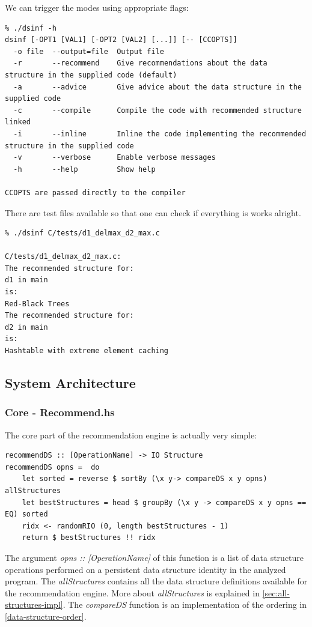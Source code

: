 \documentclass[a4paper,11pt]{article}
\begin{document}
\begin{appendices}
	We can trigger the modes using appropriate flags:
	
	\begingroup
    \fontsize{8pt}{12pt}\selectfont
    \begin{verbatim}  
% ./dsinf -h
dsinf [-OPT1 [VAL1] [-OPT2 [VAL2] [...]] [-- [CCOPTS]]
  -o file  --output=file  Output file
  -r       --recommend    Give recommendations about the data structure in the supplied code (default)
  -a       --advice       Give advice about the data structure in the supplied code
  -c       --compile      Compile the code with recommended structure linked
  -i       --inline       Inline the code implementing the recommended structure in the supplied code
  -v       --verbose      Enable verbose messages
  -h       --help         Show help

CCOPTS are passed directly to the compiler
    \end{verbatim}  
\endgroup
	
	There are test files available so that one can check if everything is works alright.
	\begin{verbatim}
% ./dsinf C/tests/d1_delmax_d2_max.c

C/tests/d1_delmax_d2_max.c:
The recommended structure for:
d1 in main
is:
Red-Black Trees
The recommended structure for:
d2 in main
is:
Hashtable with extreme element caching
	\end{verbatim}
	
	\subsection{System Architecture}
		\subsubsection{Core - Recommend.hs} \label{sec:recommend-impl}
		The core part of the recommendation engine is actually very simple:

\begin{verbatim}
recommendDS :: [OperationName] -> IO Structure
recommendDS opns =  do
    let sorted = reverse $ sortBy (\x y-> compareDS x y opns) allStructures
    let bestStructures = head $ groupBy (\x y -> compareDS x y opns == EQ) sorted
    ridx <- randomRIO (0, length bestStructures - 1)
    return $ bestStructures !! ridx
\end{verbatim}
		The argument \emph{opns :: [OperationName]} of this function is a list of data 
		structure operations performed on a persistent data structure identity in the 
		analyzed program. The \emph{allStructures} contains all the data structure definitions
		available for the recommendation engine. More about \emph{allStructures} is explained
		in \autoref{sec:all-structures-impl}. The \emph{compareDS} function is an implementation
		of the ordering in \autoref{data-structure-order}.
		

\end{appendices}
\end{document}
